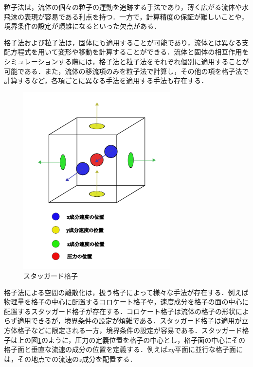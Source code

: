 \documentclass[a4j,12pt]{jreport}
\begin{document}
粒子法は，流体の個々の粒子の運動を追跡する手法であり，薄く広がる流体や水飛沫の表現が容易である利点を持つ．一方で，計算精度の保証が難しいことや，境界条件の設定が煩雑になるといった欠点がある．

格子法および粒子法は，固体にも適用することが可能であり，流体とは異なる支配方程式を用いて変形や移動を計算することができる．流体と固体の相互作用をシミュレーションする際には，格子法と粒子法をそれぞれ個別に適用することが可能である\cite{EOL}．また，流体の移流項のみを粒子法で計算し，その他の項を格子法で計算するなど，各項ごとに異なる手法を適用する手法\cite{FLIP,APIC}も存在する．

\begin{figure}[H]
\begin{center}
\includegraphics[width=80mm]{images/3dstaggerd.png}
\caption{スタッガード格子}
\label{fig:staggerd}
\end{center}
\end{figure}
格子法による空間の離散化は，扱う格子によって様々な手法が存在する．例えば物理量を格子の中心に配置するコロケート格子や，速度成分を格子の面の中心に配置するスタッガード格子が存在する．コロケート格子は流体の格子の形状によらず適用できるが，境界条件の設定が煩雑である．スタッガード格子は適用が立方体格子などに限定される一方，境界条件の設定が容易である．スタッガード格子は上の図\ref{fig:staggerd}のように，圧力の定義位置を格子の中心とし，格子面の中心にその格子面と垂直な流速の成分の位置を定義する．例えば$xy$平面に並行な格子面には，その地点での流速の$z$成分を配置する．
\end{document}
